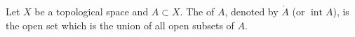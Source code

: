 Let $X$ be a topological space and $A \subset X$. The  of $A$, denoted by $\mathring{A}$ (or $\operatorname{int} A$), is the open set which is the union of all open subsets of $A$.
